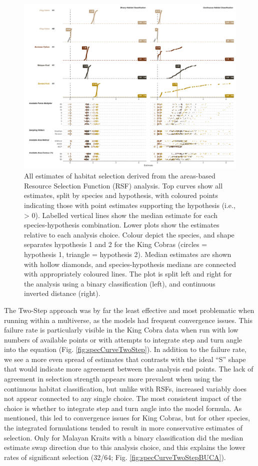 \documentclass[10pt,a4paper]{article}
\begin{document}
\begin{figure}
\includegraphics[width=1\linewidth]{../../figures/specCurve_rsf} \caption{All estimates of habitat selection derived from the areas-based Resource Selection Function (RSF) analysis. Top curves show all estimates, split by species and hypothesis, with coloured points indicating those with point estimates supporting the hypothesis (i.e., > 0). Labelled vertical lines show the median estimate for each species-hypothesis combination. Lower plots show the estimates relative to each analysis choice. Colour depict the species, and shape separates hypothesis 1 and 2 for the King Cobras (circles = hypothesis 1, triangle = hypothesis 2). Median estimates are shown with hollow diamonds, and species-hypothesis medians are connected with appropriately coloured lines. The plot is split left and right for the analysis using a binary classification (left), and continuous inverted distance (right).}\label{fig:specCurveRsf}
\end{figure}

The Two-Step approach was by far the least effective and most problematic when running within a multiverse, as the models had frequent convergence issues.
This failure rate is particularly visible in the King Cobra data when run with low numbers of available points or with attempts to integrate step and turn angle into the equation (Fig. \ref{fig:specCurveTwoStep}).
In addition to the failure rate, we see a more even spread of estimates that contrasts with the ideal ``S'' shape that would indicate more agreement between the analysis end points.
The lack of agreement in selection strength appears more prevalent when using the continuous habitat classification, but unlike with RSFs, increased variably does not appear connected to any single choice.
The most consistent impact of the choice is whether to integrate step and turn angle into the model formula.
As mentioned, this led to convergence issues for King Cobras, but for other species, the integrated formulations tended to result in more conservative estimates of selection.
Only for Malayan Kraits with a binary classification did the median estimate swap direction due to this analysis choice, and this explains the lower rates of significant selection (32/64; Fig. \ref{fig:specCurveTwoStepBUCA}).
\end{document}
